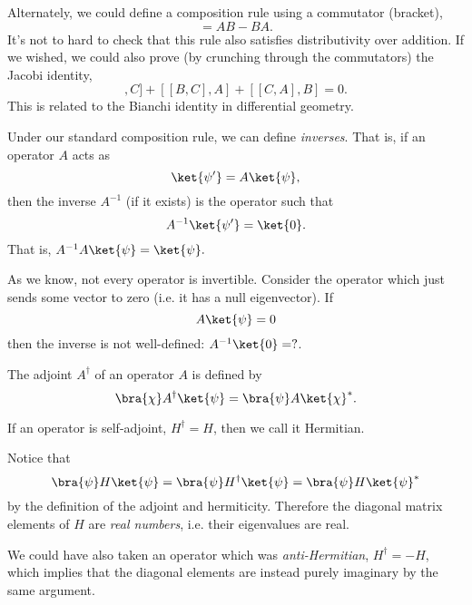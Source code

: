 Alternately, we could define a composition rule using a commutator (bracket),
\begin{equation}
    [A,B]=AB-BA.
\end{equation}
It's not to hard to check that this rule also satisfies distributivity over addition. If we wished, we could also prove (by crunching through the commutators) the Jacobi identity,
\begin{equation}
    [[A,B],C]+ [[B,C],A]+[[C,A],B]=0.
\end{equation}
This is related to the Bianchi identity in differential geometry.

Under our standard composition rule, we can define \emph{inverses}. That is, if an operator $A$ acts as
\begin{equation}
    \ket{\psi'} = A \ket{\psi},
\end{equation}
then the inverse $A^{-1}$ (if it exists) is the operator such that
\begin{equation}
    A^{-1} \ket{\psi'}= \ket{0}.
\end{equation}
That is, $A^{-1} A \ket{\psi} = \ket{\psi}.$

As we know, not every operator is invertible. Consider the operator which just sends some vector to zero (i.e. it has a null eigenvector). If
\begin{equation}
    A\ket{\psi}=0
\end{equation}
then the inverse is not well-defined: $A^{-1} \ket{0}=?$.%

\begin{defn}
    The adjoint $A^\dagger$ of an operator $A$ is defined by
    \begin{equation}
        \bra{\chi}A^\dagger \ket{\psi} = \bra{\psi} A \ket{\chi}^*.
    \end{equation}
\end{defn}
\begin{defn}
    If an operator is self-adjoint, $H^\dagger=H$, then we call it Hermitian.
\end{defn}
Notice that
\begin{equation}
    \bra{\psi}H \ket{\psi} = \bra{\psi} H^\dagger \ket{\psi} = \bra{\psi}H\ket{\psi}^*
\end{equation}
by the definition of the adjoint and hermiticity. Therefore the diagonal matrix elements of $H$ are \emph{real numbers}, i.e. their eigenvalues are real.

We could have also taken an operator which was \emph{anti-Hermitian}, $H^\dagger = -H$, which implies that the diagonal elements are instead purely imaginary by the same argument.

